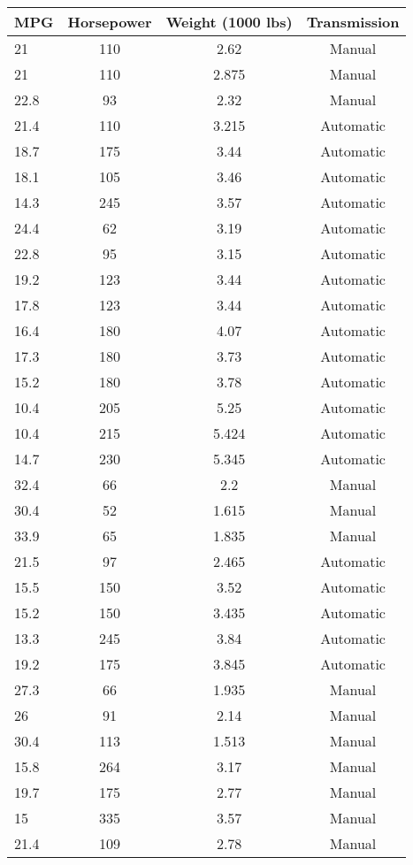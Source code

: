 \begin{table}[!htbp]
\centering

\begin{tabular*}{0.8\linewidth}{@{\extracolsep{\fill}}l*{3}{c}}
\hline\hline
MPG & Horsepower & Weight (1000 lbs) & Transmission\\
\hline
21 & 110 & 2.62 & Manual\\
21 & 110 & 2.875 & Manual\\
22.8 & 93 & 2.32 & Manual\\
21.4 & 110 & 3.215 & Automatic\\
18.7 & 175 & 3.44 & Automatic\\
18.1 & 105 & 3.46 & Automatic\\
14.3 & 245 & 3.57 & Automatic\\
24.4 & 62 & 3.19 & Automatic\\
22.8 & 95 & 3.15 & Automatic\\
19.2 & 123 & 3.44 & Automatic\\
17.8 & 123 & 3.44 & Automatic\\
16.4 & 180 & 4.07 & Automatic\\
17.3 & 180 & 3.73 & Automatic\\
15.2 & 180 & 3.78 & Automatic\\
10.4 & 205 & 5.25 & Automatic\\
10.4 & 215 & 5.424 & Automatic\\
14.7 & 230 & 5.345 & Automatic\\
32.4 & 66 & 2.2 & Manual\\
30.4 & 52 & 1.615 & Manual\\
33.9 & 65 & 1.835 & Manual\\
21.5 & 97 & 2.465 & Automatic\\
15.5 & 150 & 3.52 & Automatic\\
15.2 & 150 & 3.435 & Automatic\\
13.3 & 245 & 3.84 & Automatic\\
19.2 & 175 & 3.845 & Automatic\\
27.3 & 66 & 1.935 & Manual\\
26 & 91 & 2.14 & Manual\\
30.4 & 113 & 1.513 & Manual\\
15.8 & 264 & 3.17 & Manual\\
19.7 & 175 & 2.77 & Manual\\
15 & 335 & 3.57 & Manual\\
21.4 & 109 & 2.78 & Manual\\
\hline\hline
\end{tabular*}
\end{table}

